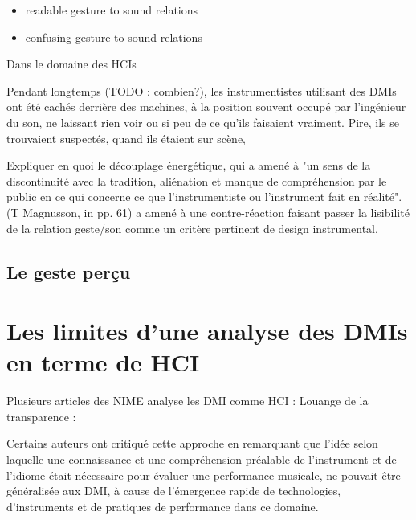  \cite{wanderley_controle_1999}



\vspace{-1em}
\begin{itemize}[noitemsep]
\item readable gesture to sound relations
\item confusing gesture to sound relations
\end{itemize}


Dans le domaine des \glspl{HCI} 

Pendant longtemps (TODO : combien?), les instrumentistes utilisant des \glspl{DMI} ont été cachés derrière des machines, à la position souvent occupé par l'ingénieur du son, ne laissant rien voir ou si peu de ce qu'ils faisaient vraiment. Pire, ils se trouvaient suspectés, quand ils étaient sur scène, 


Expliquer en quoi le découplage énergétique, qui a amené à "un sens de la discontinuité avec la tradition, aliénation et manque de compréhension par le public en ce qui concerne ce que l'instrumentiste ou l'instrument fait en réalité". (T Magnusson, in \cite{magnusson_sonic_2019} pp. 61) a amené à une contre-réaction faisant passer la lisibilité de la relation geste/son comme un critère pertinent de design instrumental.

\subsection{Le geste perçu}


\section{Les limites d'une analyse des DMIs en terme de HCI}
\label{sec:transparency:limitesHCI}

Plusieurs articles des NIME analyse les DMI comme \gls{HCI} : 
Louange de la transparence : \cite{fels_mapping_2002}

Certains auteurs ont critiqué cette approche \cite{fyans_where_2009} en remarquant que l'idée selon laquelle une connaissance et une compréhension préalable de l'instrument et de l'idiome était nécessaire pour évaluer une performance musicale, ne pouvait être généralisée aux DMI, à cause de l'émergence rapide de technologies, d'instruments et de pratiques de performance dans ce domaine. 

